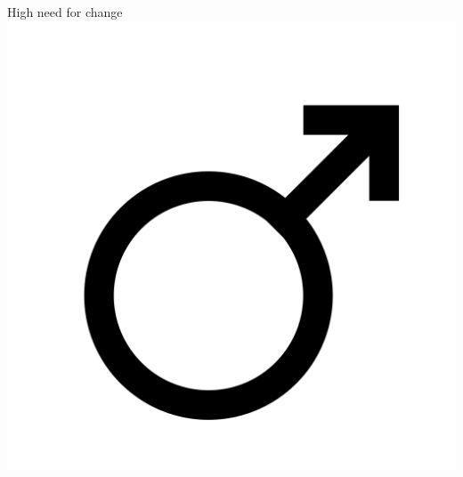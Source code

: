 \documentclass[aspectratio=169]{beamer}
\begin{document}
\begin{frame}
	   \begin{center}
		       \Huge High need for change \\
		       \includegraphics[scale=.025]{./assets/men.png} \\
		       \small \cite{langford93}
	     \end{center}
\end{frame}
\end{document}
